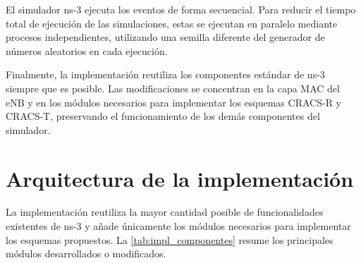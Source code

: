El simulador ns-3 ejecuta los eventos de forma secuencial. Para reducir el tiempo total de ejecución de las simulaciones, estas se ejecutan en paralelo mediante procesos independientes, utilizando una semilla diferente del generador de números aleatorios en cada ejecución.

Finalmente, la implementación reutiliza los componentes estándar de ns-3 siempre que es posible. Las modificaciones se concentran en la capa MAC del eNB y en los módulos necesarios para implementar los esquemas CRACS-R y CRACS-T, preservando el funcionamiento de los demás componentes del simulador.

\label{sec:impl_arquitectura}

\section{Arquitectura de la implementación}
\label{sec:impl_arquitectura}

La implementación reutiliza la mayor cantidad posible de funcionalidades existentes de ns-3 y añade únicamente los módulos necesarios para implementar los esquemas propuestos. La \cref{tab:impl_componentes} resume los principales módulos desarrollados o modificados.

